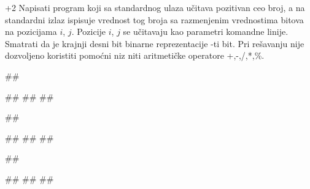 \begin{Exercise}[label=209]\marker+{2}
Napisati program koji sa standardnog ulaza učitava pozitivan
  ceo broj, a na standardni izlaz ispisuje vrednost tog broja sa
  razmenjenim vrednostima bitova na pozicijama $i$,
  $j$. Pozicije $i$, $j$ se učitavaju kao parametri
  komandne linije. Smatrati da je krajnji desni bit binarne
  reprezentacije -ti bit. Pri rešavanju nije dozvoljeno koristiti
  pomoćni niz niti aritmetičke operatore +,-,/,*,\%.


\begin{minitest}
\begin{upotreba}{1}
##

#\naslovInt#
##
##
\end{upotreba}
\end{minitest}
\begin{minitest}
\begin{upotreba}{2}
##

#\naslovInt#
##
##
\end{upotreba}
\end{minitest}
\begin{minitest}
\begin{upotreba}{2}
##

#\naslovInt#
##
##
\end{upotreba}
\end{minitest}

\end{Exercise}
\begin{Answer}[ref=209]
\end{Answer}

